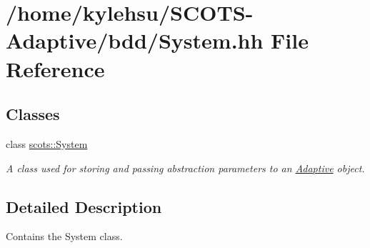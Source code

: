 \hypertarget{System_8hh}{}\section{/home/kylehsu/\+S\+C\+O\+T\+S-\/\+Adaptive/bdd/\+System.hh File Reference}
\label{System_8hh}
\subsection*{Classes}
\begin{DoxyCompactItemize}
\item 
class \hyperlink{classscots_1_1System}{scots\+::\+System}
\begin{DoxyCompactList}\small\item\em A class used for storing and passing abstraction parameters to an \hyperlink{classscots_1_1Adaptive}{Adaptive} object. \end{DoxyCompactList}\end{DoxyCompactItemize}


\subsection{Detailed Description}
Contains the System class. 